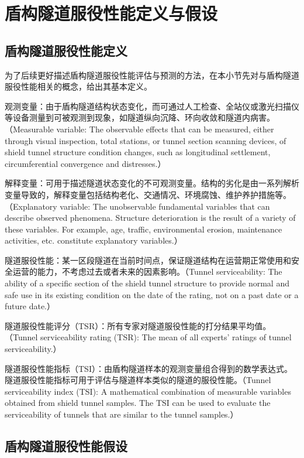 \section{盾构隧道服役性能定义与假设}

\subsection{盾构隧道服役性能定义}

为了后续更好描述盾构隧道服役性能评估与预测的方法，在本小节先对与盾构隧道服役性能相关的概念，给出其基本定义。

观测变量：由于盾构隧道结构状态变化，而可通过人工检查、全站仪或激光扫描仪等设备测量到可被观测到现象，如隧道纵向沉降、环向收敛和隧道内病害。（Measurable variable: The observable effects that can be measured, either through visual inspection, total stations, or tunnel section scanning devices, of shield tunnel structure condition changes, such as longitudinal settlement, circumferential convergence and distresses.）

解释变量：可用于描述隧道状态变化的不可观测变量。结构的劣化是由一系列解析变量导致的，解释变量包括结构老化、交通情况、环境腐蚀、维护养护措施等。（Explanatory variable: The unobservable fundamental variables that can describe observed phenomena. Structure deterioration is the result of a variety of these variables. For example, age, traffic, environmental erosion, maintenance activities, etc. constitute explanatory variables.）

隧道服役性能：某一区段隧道在当前时间点，保证隧道结构在运营期正常使用和安全运营的能力，不考虑过去或者未来的因素影响。（Tunnel serviceability: The ability of a speciﬁc section of the shield tunnel structure to provide normal and safe use in its existing condition on the date of the rating, not on a past date or a future date.）

隧道服役性能评分（TSR）：所有专家对隧道服役性能的打分结果平均值。（Tunnel serviceability rating (TSR): The mean of all experts' ratings of tunnel serviceability.）

隧道服役性能指标（TSI）：由盾构隧道样本的观测变量组合得到的数学表达式。隧道服役性能指标可用于评估与隧道样本类似的隧道的服役性能。（Tunnel serviceability index (TSI): A mathematical combination of measurable variables obtained from shield tunnel samples. The TSI can be used to evaluate the serviceability of tunnels that are similar to the tunnel samples.）

\subsection{盾构隧道服役性能假设}

